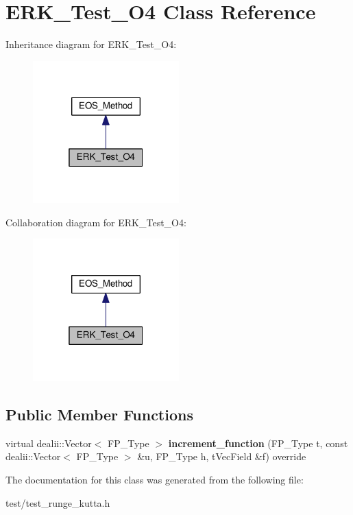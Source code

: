 \hypertarget{classERK__Test__O4}{}\section{E\+R\+K\+\_\+\+Test\+\_\+\+O4 Class Reference}
\label{classERK__Test__O4}


Inheritance diagram for E\+R\+K\+\_\+\+Test\+\_\+\+O4\+:\nopagebreak
\begin{figure}[H]
\begin{center}
\leavevmode
\includegraphics[width=160pt]{classERK__Test__O4__inherit__graph}
\end{center}
\end{figure}


Collaboration diagram for E\+R\+K\+\_\+\+Test\+\_\+\+O4\+:\nopagebreak
\begin{figure}[H]
\begin{center}
\leavevmode
\includegraphics[width=160pt]{classERK__Test__O4__coll__graph}
\end{center}
\end{figure}
\subsection*{Public Member Functions}
\begin{DoxyCompactItemize}
\item 
\mbox{\label{classERK__Test__O4_ad3bd6607faff8d74ff6759ac9963d0a4}} 
virtual dealii\+::\+Vector$<$ F\+P\+\_\+\+Type $>$ {\bfseries increment\+\_\+function} (F\+P\+\_\+\+Type t, const dealii\+::\+Vector$<$ F\+P\+\_\+\+Type $>$ \&u, F\+P\+\_\+\+Type h, t\+Vec\+Field \&f) override
\end{DoxyCompactItemize}


The documentation for this class was generated from the following file\+:\begin{DoxyCompactItemize}
\item 
test/test\+\_\+runge\+\_\+kutta.\+h\end{DoxyCompactItemize}
